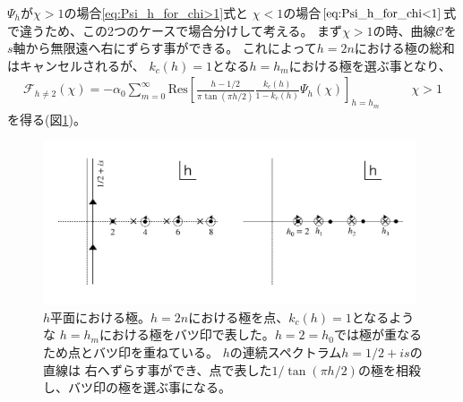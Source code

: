 $\Psi_h$が$\chi > 1$の場合\eqref{eq:Psi_h_for_chi>1}式と
$\chi < 1$の場合$\eqref{eq:Psi_h_for_chi<1}$式で違うため、この2つのケースで場合分けして考える。
まず$\chi > 1$の時、曲線$\mathcal{C}$を$s$軸から無限遠へ右にずらす事ができる。
これによって$h = 2n$における極の総和はキャンセルされるが、
$k_c(h) = 1$となる$h = h_m$における極を選ぶ事となり、
\begin{align}
	\mathcal{F}_{h\neq 2}(\chi)
	= -\alpha_0\sum_{m=0}^{\infty}\mathrm{Res}\left[
		\frac{h - 1/2}{\pi\tan(\pi h / 2)}\frac{k_c(h)}{1 - k_c(h)}\Psi_h(\chi)
	\right]_{h=h_m}
	\hspace{30pt}\chi > 1
\end{align}
を得る(図\ref{fig:poles})。
\begin{figure}[ht]
	\centering
	\includegraphics[width=11cm]{figures/poles}
	\caption{$h$平面における極。$h = 2n$における極を点、$k_c(h) = 1$となるような
	$h = h_m$における極をバツ印で表した。$h = 2 = h_0$では極が重なるため点とバツ印を重ねている。
	$h$の連続スペクトラム$h = 1/2 + is$の直線は
	右へずらす事ができ、点で表した$1/\tan(\pi h/2)$の極を相殺し、バツ印の極を選ぶ事になる。}
	\label{fig:poles}
\end{figure}

